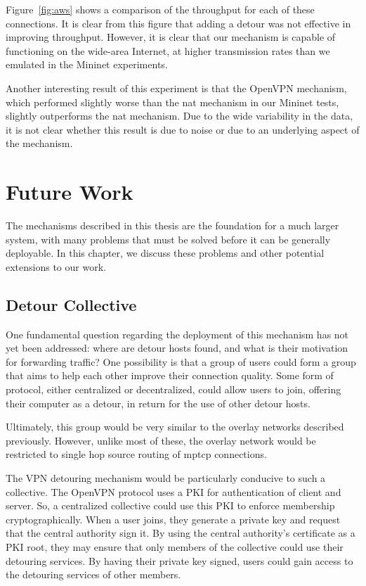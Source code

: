 \documentclass{cwru}
\begin{document}
Figure~\ref{fig:aws} shows a comparison of the throughput for each of these
connections. It is clear from this figure that adding a detour was not effective
in improving throughput. However, it is clear that our mechanism is capable of
functioning on the wide-area Internet, at higher transmission rates than we
emulated in the Mininet experiments.

Another interesting result of this experiment is that the OpenVPN mechanism,
which performed slightly worse than the \ac{nat} mechanism in our Mininet tests,
slightly outperforms the \ac{nat} mechanism. Due to the wide variability in the
data, it is not clear whether this result is due to noise or due to an
underlying aspect of the mechanism.

\chapter{Future Work}
\label{c:fw}

The mechanisms described in this thesis are the foundation for a much larger
system, with many problems that must be solved before it can be generally
deployable. In this chapter, we discuss these problems and other potential
extensions to our work.

\section{Detour Collective}

One fundamental question regarding the deployment of this mechanism has not yet
been addressed: where are detour hosts found, and what is their motivation for
forwarding traffic? One possibility is that a group of users could form a group
that aims to help each other improve their connection quality. Some form of
protocol, either centralized or decentralized, could allow users to join,
offering their computer as a detour, in return for the use of other detour
hosts.

Ultimately, this group would be very similar to the overlay networks described
previously. However, unlike most of these, the overlay network would be
restricted to single hop source routing of \ac{mptcp} connections.

The VPN detouring mechanism would be particularly conducive to such a
collective. The OpenVPN protocol uses a PKI for authentication of client and
server. So, a centralized collective could use this PKI to enforce membership
cryptographically. When a user joins, they generate a private key and request
that the central authority sign it. By using the central authority's certificate
as a PKI root, they may ensure that only members of the collective could use
their detouring services. By having their private key signed, users could gain
access to the detouring services of other members.
\end{document}
